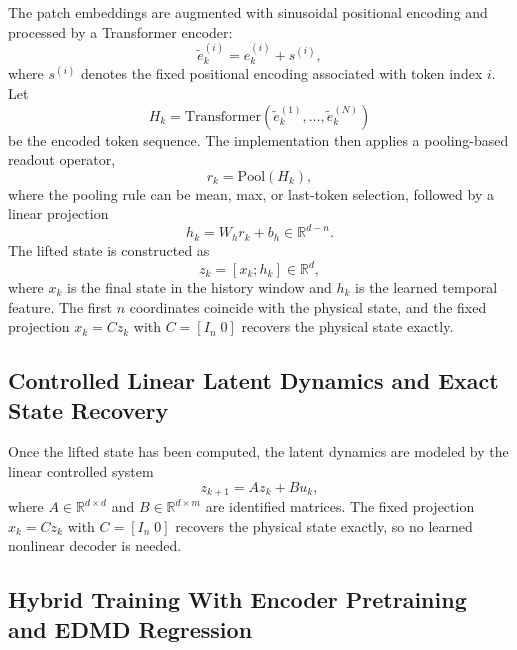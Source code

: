 \documentclass[journal]{IEEEtran}
\begin{document}
The patch embeddings are augmented with sinusoidal positional encoding and processed by a Transformer encoder:
\begin{equation}
    \tilde{e}_k^{(i)} = e_k^{(i)} + s^{(i)},
\end{equation}
where $s^{(i)}$ denotes the fixed positional encoding associated with token index $i$. Let
\begin{equation}
    H_k = \mathrm{Transformer}(\tilde{e}_k^{(1)},\ldots,\tilde{e}_k^{(N)})
\end{equation}
be the encoded token sequence. The implementation then applies a pooling-based readout operator,
\begin{equation}
    r_k = \mathrm{Pool}(H_k),
\end{equation}
where the pooling rule can be mean, max, or last-token selection, followed by a linear projection
\begin{equation}
    h_k = W_h r_k + b_h \in \mathbb{R}^{d-n}.
    \label{eq:history_feature}
\end{equation}
The lifted state is constructed as
\begin{equation}
    z_k = [x_k;h_k] \in \mathbb{R}^{d},
    \label{eq:lifted_state_form}
\end{equation}
where $x_k$ is the final state in the history window and $h_k$ is the learned temporal feature. The first $n$ coordinates coincide with the physical state, and the fixed projection $x_k=Cz_k$ with $C=[I_n\;0]$ recovers the physical state exactly.

\subsection{Controlled Linear Latent Dynamics and Exact State Recovery}

Once the lifted state has been computed, the latent dynamics are modeled by the linear controlled system
\begin{equation}
    z_{k+1} = A z_k + B u_k,
    \label{eq:learned_dynamics}
\end{equation}
where $A \in \mathbb{R}^{d\times d}$ and $B \in \mathbb{R}^{d\times m}$ are identified matrices. The fixed projection $x_k=Cz_k$ with $C=[I_n\;0]$ recovers the physical state exactly, so no learned nonlinear decoder is needed.

\subsection{Hybrid Training With Encoder Pretraining and EDMD Regression}
\end{document}
